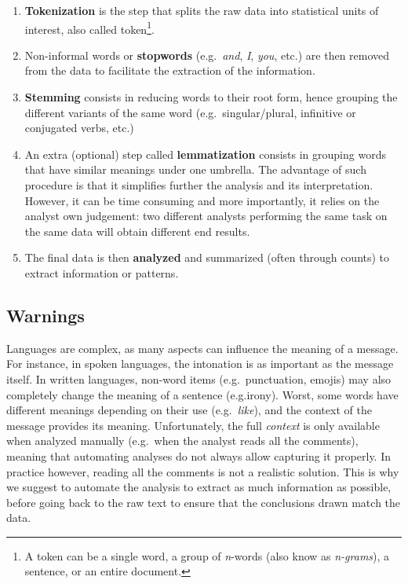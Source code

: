 \documentclass[
]{krantz}
\providecommand{\tightlist}{%
  \setlength{\itemsep}{0pt}\setlength{\parskip}{0pt}}
\begin{document}
\begin{enumerate}
\def\labelenumi{\arabic{enumi}.}
\tightlist
\item
  \textbf{Tokenization} is the step that splits the raw data into statistical units of interest, also called token\footnote{A token can be a single word, a group of \emph{n}-words (also know as \emph{n-grams}), a sentence, or an entire document.}.
\item
  Non-informal words or \textbf{stopwords} (e.g.~\emph{and}, \emph{I}, \emph{you}, etc.) are then removed from the data to facilitate the extraction of the information.
\item
  \textbf{Stemming} consists in reducing words to their root form, hence grouping the different variants of the same word (e.g.~singular/plural, infinitive or conjugated verbs, etc.)
\item
  An extra (optional) step called \textbf{lemmatization} consists in grouping words that have similar meanings under one umbrella. The advantage of such procedure is that it simplifies further the analysis and its interpretation. However, it can be time consuming and more importantly, it relies on the analyst own judgement: two different analysts performing the same task on the same data will obtain different end results.
\item
  The final data is then \textbf{analyzed} and summarized (often through counts) to extract information or patterns.
\end{enumerate}

\hypertarget{warnings}{%
\subsection{Warnings}\label{warnings}}

Languages are complex, as many aspects can influence the meaning of a message. For instance, in spoken languages, the intonation is as important as the message itself. In written languages, non-word items (e.g.~punctuation, emojis) may also completely change the meaning of a sentence (e.g.irony). Worst, some words have different meanings depending on their use (e.g.~\emph{like}), and the context of the message provides its meaning. Unfortunately, the full \emph{context} is only available when analyzed manually (e.g.~when the analyst reads all the comments), meaning that automating analyses do not always allow capturing it properly. In practice however, reading all the comments is not a realistic solution. This is why we suggest to automate the analysis to extract as much information as possible, before going back to the raw text to ensure that the conclusions drawn match the data.
\end{document}
